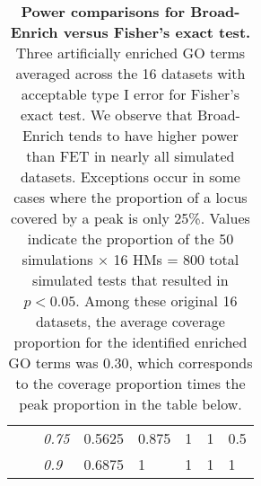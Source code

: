 \begin{table}[!ht]
\begin{tabular}{ll|l|llll|l}
                            &                      & \textit{0.75}      & 0.5625        & 0.875        & 1             & 1            & 0.5         \\
                            &                      & \textit{0.9}       & 0.6875        & 1            & 1             & 1            & 1
\end{tabular}
\normalsize
\caption[Power comparisons for Broad-Enrich versus Fisher's exact test]
{
\textbf{Power comparisons for Broad-Enrich versus Fisher's exact test.}
Three artificially enriched GO terms averaged across the 16 datasets with acceptable type I error for Fisher's exact test. We observe that Broad-Enrich tends to have higher power than FET in nearly all simulated datasets. Exceptions occur in some cases where the proportion of a locus covered by a peak is only 25\%. Values indicate the proportion of the 50 simulations $\times$ 16 HMs = 800 total simulated tests that resulted in $p < 0.05$. Among these original 16 datasets, the average coverage proportion for the identified enriched GO terms was 0.30, which corresponds to the coverage proportion times the peak proportion in the table below.
}
\label{chap2:table:5}

\end{table}

\newpage

